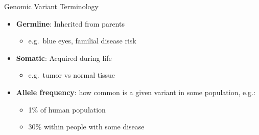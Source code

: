 \documentclass[
  ignorenonframetext,
]{beamer}
\providecommand{\tightlist}{%
  \setlength{\itemsep}{0pt}\setlength{\parskip}{0pt}}
\begin{document}
\begin{frame}{Genomic Variant Terminology}
\label{genomic-variant-terminology}
\Large

\begin{itemize}
\tightlist
\item
  \textbf{Germline}: Inherited from parents

  \begin{itemize}
  \tightlist
  \item
    e.g.~blue eyes, familial disease risk
  \end{itemize}
\item
  \textbf{Somatic}: Acquired during life

  \begin{itemize}
  \tightlist
  \item
    e.g.~tumor vs normal tissue
  \end{itemize}
\item
  \textbf{Allele frequency}: how common is a given variant in some
  population, e.g.:

  \begin{itemize}
  \tightlist
  \item
    1\% of human population
  \item
    30\% within people with some disease
  \end{itemize}
\end{itemize}
\end{frame}
\end{document}
